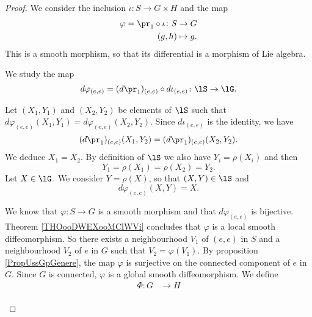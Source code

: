 \begin{theorem}
\begin{proof}
	We consider the inclusion \( \iota\colon S\to G\times H\) and the map
	\begin{equation}
		\begin{aligned}
			\varphi=\pr_1\circ\iota\colon S & \to G      \\
			(g,h)                           & \mapsto g.
		\end{aligned}
	\end{equation}
	This is a smooth morphism, so that its differential is a morphism of Lie algebra.
	\begin{subproof}
		We study the map
		\begin{equation}
			d\varphi_{(e,e)}=(d\pr_1)_{(e,e)}\circ d\iota_{(e,e)}\colon \lS\to \lG.
		\end{equation}
		\begin{subproof}
			\spitem[Injection]
			Let \( (X_1,Y_1)\) and \( (X_2,Y_2)\) be elements of \( \lS\) such that \( d\varphi_{(e,e)}(X_1,Y_1)=d\varphi_{(e,e)}(X_2,Y_2)\). Since \( d\iota_{(e,e)}\) is the identity, we have
			\begin{equation}
				(d\pr_1)_{(e,e)}(X_1,Y_2)=(d\pr_1)_{(e,e)}(X_2,Y_2).
			\end{equation}
			We deduce \( X_1=X_2\). By definition of \( \lS\) we also have \( Y_i=\rho(X_i)\) and then
			\begin{equation}
				Y_1=\rho(X_1)=\rho(X_2)=Y_2.
			\end{equation}
			\spitem[Surjection]
			Let \( X\in\lG\). We consider \( Y=\rho(X)\), so that \( (X,Y)\in \lS\) and
			\begin{equation}
				d\varphi_{(e,e)}(X,Y)=X.
			\end{equation}
		\end{subproof}
		\spitem[Diffeomorphism]
		We know that \( \varphi\colon S\to G\) is a smooth morphism and that \( d\varphi_{(e,e)}\) is bijective. Theorem \ref{THOooDWEXooMClWVi} concludes that \( \varphi\) is a local smooth diffeomorphism. So there exists a neighbourhood \( V_1\) of \( (e,e)\) in \( S\) and a neighbourhood \( V_2\) of \( e\) in \( G\) such that \( V_2=\varphi(V_1)\). By proposition \ref{PropUssGpGenere}, the map \( \varphi\) is surjective on the connected component of \( e\) in \( G\). Since \( G\) is connected, \( \varphi\) is a global smooth diffeomorphism.
		We define
		\begin{equation}
			\begin{aligned}
				\Phi\colon G & \to H                     \\

\end{aligned}
\end{equation}
\end{subproof}
\end{proof}
\end{theorem}
